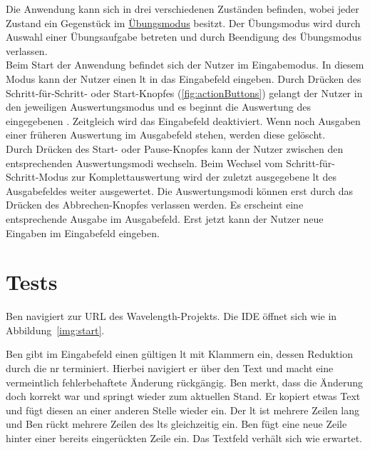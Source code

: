 \documentclass[parskip=full,11pt,twoside]{scrartcl}
\begin{document}
Die Anwendung kann sich in drei verschiedenen Zuständen befinden, wobei jeder Zustand ein Gegenstück im \hyperref[fnc:ex]{Übungsmodus} besitzt. 
Der Übungsmodus wird durch Auswahl einer Übungsaufgabe betreten und durch Beendigung des Übungsmodus verlassen.\\
Beim Start der Anwendung befindet sich der Nutzer im Eingabemodus. In diesem Modus kann der Nutzer einen \gls{lt} in das Eingabefeld eingeben. 
Durch Drücken des Schritt-für-Schritt- oder Start-Knopfes (\cref{fig:actionButtons}) gelangt der Nutzer in den jeweiligen Auswertungsmodus und es beginnt die Auswertung des eingegebenen . 
Zeitgleich wird das Eingabefeld deaktiviert. Wenn noch Ausgaben einer früheren Auswertung im Ausgabefeld stehen, werden diese gelöscht.\\ 
Durch Drücken des Start- oder Pause-Knopfes kann der Nutzer zwischen den entsprechenden Auswertungsmodi wechseln. 
Beim Wechsel vom Schritt-für-Schritt-Modus zur Komplettauswertung wird der zuletzt ausgegebene \gls{lt} des Ausgabefeldes weiter ausgewertet.
Die Auswertungsmodi können erst durch das Drücken des Abbrechen-Knopfes verlassen werden. Es erscheint eine entsprechende Ausgabe im Ausgabefeld. Erst jetzt kann der Nutzer neue Eingaben im Eingabefeld eingeben.


\section{Tests}


{Ben navigiert zur URL des Wavelength-Projekts.}
{Die IDE öffnet sich wie in Abbildung~\ref{img:start}.}

{Ben gibt im Eingabefeld einen gültigen \gls{lt} mit Klammern ein,
dessen Reduktion durch die \gls{nr} terminiert.
Hierbei navigiert er über den Text und macht eine vermeintlich fehlerbehaftete Änderung rückgängig. 
Ben merkt, dass die Änderung doch korrekt war und springt wieder zum aktuellen Stand. Er kopiert etwas Text und fügt diesen an einer anderen Stelle wieder ein.
Der \gls{lt} ist mehrere Zeilen lang und Ben rückt mehrere Zeilen des \gls{lt}s gleichzeitig ein.
Ben fügt eine neue Zeile hinter einer bereits eingerückten Zeile ein.}
{Das Textfeld verhält sich wie erwartet.}
\end{document}
